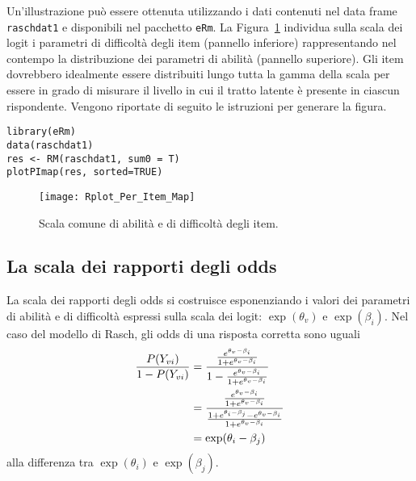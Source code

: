 Un'illustrazione può essere ottenuta utilizzando i dati contenuti nel data frame {\tt raschdat1} e disponibili nel pacchetto {\tt eRm}.  La Figura~\ref{fig:per_item_map} individua sulla scala dei logit i parametri di difficoltà degli item  (pannello  inferiore) rappresentando nel contempo la distribuzione dei parametri di abilità (pannello  superiore). Gli item dovrebbero idealmente essere distribuiti lungo tutta la gamma della scala per essere in grado di misurare il livello in cui il tratto latente è presente in ciascun rispondente.
Vengono riportate di seguito le istruzioni \R\; per generare la figura.  
\begin{lstlisting}
library(eRm)
data(raschdat1)
res <- RM(raschdat1, sum0 = T)
plotPImap(res, sorted=TRUE)
\end{lstlisting} 

\begin{figure}
  \begin{center}
    \texttt{[image: Rplot\_Per\_Item\_Map]}
    \caption{Scala comune di  abilità e di difficoltà degli item.}
    \label{fig:per_item_map}
  \end{center}
\end{figure}


\subsection{La scala dei rapporti degli odds}

La scala dei rapporti degli odds si costruisce esponenziando i valori dei parametri di abilità e di difficoltà espressi sulla scala dei logit: $\exp(\theta_v)$ e $\exp(\beta_i)$. Nel caso del modello di Rasch, gli odds di una risposta corretta sono uguali 
\begin{align}
\frac{P(Y_{vi})}{1-P(Y_{vi})}&=\frac{ \frac{e^{\theta_v-\beta_i}}{1+e^{\theta_v-\beta_i}} }{1-\frac{e^{\theta_v-\beta_i}}{1+e^{\theta_v-\beta_i}}}\notag\\
&=\frac{ \frac{e^{\theta_v-\beta_i}}{1+e^{\theta_v-\beta_i}} }{\frac{ 1+e^{\theta_i-\beta_j} - e^{\theta_v-\beta_i}}{1+e^{\theta_v-\beta_i}}}\notag\\
&= \exp(\theta_i-\beta_j)
\end{align}
alla differenza tra  $\exp(\theta_i)$ e $\exp(\beta_j)$.  

